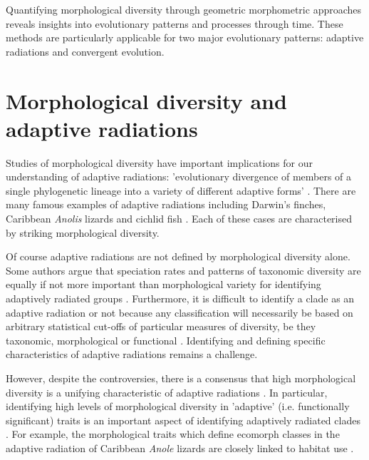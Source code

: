 	Quantifying morphological diversity through geometric morphometric approaches reveals insights into evolutionary patterns and processes through time. These methods are particularly applicable for two major evolutionary patterns: adaptive radiations and convergent evolution.
\section{Morphological diversity and adaptive radiations}

	Studies of morphological diversity have important implications for our understanding of adaptive radiations: 'evolutionary divergence of members of a single phylogenetic lineage into a variety of different adaptive forms' \citep[Futuyama 1998, cited by][]{Losos2010}.
	There are many famous examples of adaptive radiations including Darwin's finches, Caribbean \textit{Anolis} lizards and cichlid fish \citep{Gavrilets2009}. Each of these cases are characterised by striking morphological diversity.
	
	Of course adaptive radiations are not defined by morphological diversity alone. Some authors argue that speciation rates and patterns of taxonomic diversity are equally if not more important than morphological variety for identifying adaptively radiated groups \citep{Glor2010, Losos2010a}. Furthermore, it is difficult to identify a clade as an adaptive radiation or not because any classification will necessarily be based on arbitrary statistical cut-offs of particular measures of diversity, be they taxonomic, morphological or functional \citep{Olson2009}. Identifying and defining specific characteristics of adaptive radiations remains a challenge.
	
		
	However, despite the controversies, there is a consensus that high morphological diversity is a unifying characteristic of adaptive radiations \citep{Losos2010a, Olson2009}. In particular, identifying high levels of morphological diversity in 'adaptive' (i.e. functionally significant) traits is an important aspect of identifying adaptively radiated clades \citep{Losos2010a}. For example, the morphological traits which define ecomorph classes in the adaptive radiation of Caribbean \textit{Anole} lizards are closely linked to habitat use \citep{Losos1998}.


